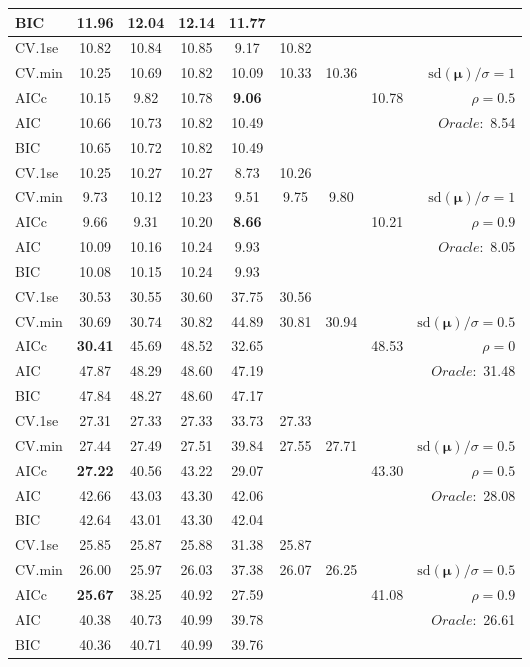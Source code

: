 \begin{table}
\begin{center}
\begin{tabular}{l*{7}{c}|r}
BIC & 11.96 & 12.04 & 12.14 & 11.77 & & & &  \\
 \hline 
CV.1se & 10.82 & 10.84 & 10.85 & 9.17 & 10.82 & & & \\
CV.min & 10.25 & 10.69 & 10.82 & 10.09 & 10.33 & 10.36 & & $\mathrm{sd}(\mathbf{\mu})/\sigma=1$ \\
AICc & 10.15 & 9.82 & 10.78 & {\bf 9.06} & & & 10.78 &  $\rho=0.5$ \\
AIC & 10.66 & 10.73 & 10.82 & 10.49 & & & &  \multirow{2}{*}{$Oracle: $ 8.54} \\
BIC & 10.65 & 10.72 & 10.82 & 10.49 & & & &  \\
 \hline 
CV.1se & 10.25 & 10.27 & 10.27 & 8.73 & 10.26 & & & \\
CV.min & 9.73 & 10.12 & 10.23 & 9.51 & 9.75 & 9.80 & & $\mathrm{sd}(\mathbf{\mu})/\sigma=1$ \\
AICc & 9.66 & 9.31 & 10.20 & {\bf 8.66} & & & 10.21 &  $\rho=0.9$ \\
AIC & 10.09 & 10.16 & 10.24 & 9.93 & & & &  \multirow{2}{*}{$Oracle: $ 8.05} \\
BIC & 10.08 & 10.15 & 10.24 & 9.93 & & & &  \\
 \hline 
CV.1se & 30.53 & 30.55 & 30.60 & 37.75 & 30.56 & & & \\
CV.min & 30.69 & 30.74 & 30.82 & 44.89 & 30.81 & 30.94 & & $\mathrm{sd}(\mathbf{\mu})/\sigma=0.5$ \\
AICc & {\bf 30.41} & 45.69 & 48.52 & 32.65 & & & 48.53 &  $\rho=0$ \\
AIC & 47.87 & 48.29 & 48.60 & 47.19 & & & &  \multirow{2}{*}{$Oracle: $ 31.48} \\
BIC & 47.84 & 48.27 & 48.60 & 47.17 & & & &  \\
 \hline 
CV.1se & 27.31 & 27.33 & 27.33 & 33.73 & 27.33 & & & \\
CV.min & 27.44 & 27.49 & 27.51 & 39.84 & 27.55 & 27.71 & & $\mathrm{sd}(\mathbf{\mu})/\sigma=0.5$ \\
AICc & {\bf 27.22} & 40.56 & 43.22 & 29.07 & & & 43.30 &  $\rho=0.5$ \\
AIC & 42.66 & 43.03 & 43.30 & 42.06 & & & &  \multirow{2}{*}{$Oracle: $ 28.08} \\
BIC & 42.64 & 43.01 & 43.30 & 42.04 & & & &  \\
 \hline 
CV.1se & 25.85 & 25.87 & 25.88 & 31.38 & 25.87 & & & \\
CV.min & 26.00 & 25.97 & 26.03 & 37.38 & 26.07 & 26.25 & & $\mathrm{sd}(\mathbf{\mu})/\sigma=0.5$ \\
AICc & {\bf 25.67} & 38.25 & 40.92 & 27.59 & & & 41.08 &  $\rho=0.9$ \\
AIC & 40.38 & 40.73 & 40.99 & 39.78 & & & &  \multirow{2}{*}{$Oracle: $ 26.61} \\
BIC & 40.36 & 40.71 & 40.99 & 39.76 & & & &  \\
 \hline 
\end{tabular}
\end{center}
\vspace{-1cm}
\end{table}




